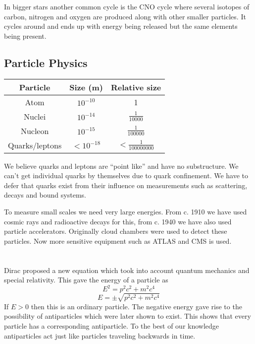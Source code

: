 In bigger stars another common cycle is the CNO cycle where several isotopes of carbon, nitrogen and oxygen are produced along with other smaller particles. It cycles around and ends up with energy being released but the same elements being present.

\subsection*{Particle Physics}

\begin{center}
\begin{tabular}{ccc}\hline
Particle & Size (\si{m}) & Relative size\\\hline
Atom & \(10^{-10}\) & 1\\[0.2em]
Nuclei & \(10^{-14}\) & \(\frac{1}{10000}\)\\[0.2em]
Nucleon & \(10^{-15}\) & \(\frac{1}{100000}\)\\[0.2em]
Quarks/leptons & \(<10^{-18}\) & \(<\frac{1}{100000000}\)\\\hline
\end{tabular}
\end{center}

We believe quarks and leptons are ``point like'' and have no substructure. We can't get individual quarks by themselves due to quark confinement. We have to defer that quarks exist from their influence on measurements such as scattering, decays and bound systems.

To measure small scales we need very large energies. From c. 1910 we have used cosmic rays and radioactive decays for this, from c. 1940 we have also used particle accelerators. Originally cloud chambers were used to detect these particles. Now more sensitive equipment such as ATLAS and CMS is used.

\section{}

Dirac proposed a new equation which took into account quantum mechanics and special relativity. This gave the energy of a particle as
\[E^2=p^2c^2+m^2c^4\]
\[E=\pm\sqrt{p^2c^2+m^2c^4}\]
If \(E>0\) then this is an ordinary particle. The negative energy gave rise to the possibility of antiparticles which were later shown to exist. This shows that every particle has a corresponding antiparticle. To the best of our knowledge antiparticles act just like particles traveling backwards in time.

